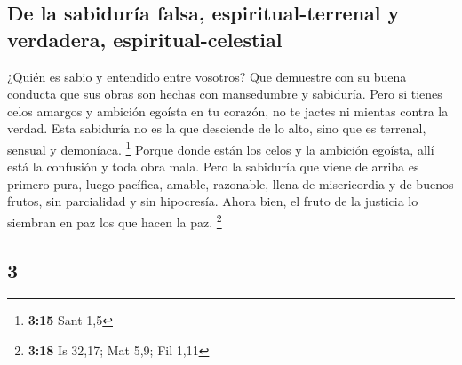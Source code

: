 \begin{paracol}{2}
\hypertarget{de-la-sabiduruxeda-falsa-espiritual-terrenal-y-verdadera-espiritual-celestial}{%
\subsection{De la sabiduría falsa, espiritual-terrenal y verdadera,
espiritual-celestial}\label{de-la-sabiduruxeda-falsa-espiritual-terrenal-y-verdadera-espiritual-celestial}}

 ¿Quién es sabio y entendido entre vosotros? Que
demuestre con su buena conducta que sus obras son hechas con mansedumbre
y sabiduría.  Pero si tienes celos amargos y ambición
egoísta en tu corazón, no te jactes ni mientas contra la verdad.
 Esta sabiduría no es la que desciende de lo alto, sino
que es terrenal, sensual y demoníaca. \footnote{\textbf{3:15} Sant 1,5}
 Porque donde están los celos y la ambición egoísta, allí
está la confusión y toda obra mala.  Pero la sabiduría
que viene de arriba es primero pura, luego pacífica, amable, razonable,
llena de misericordia y de buenos frutos, sin parcialidad y sin
hipocresía.  Ahora bien, el fruto de la justicia lo
siembran en paz los que hacen la paz. \footnote{\textbf{3:18} Is 32,17;
  Mat 5,9; Fil 1,11}

\switchcolumn
\begin{otherlanguage}{english}

\hypertarget{section-5}{%
\section{3}\label{section-5}}


\end{otherlanguage}
\end{paracol}
